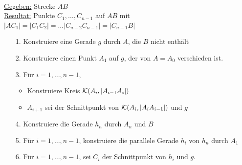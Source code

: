 \begin{konst}  
\phantom{Pups}\hspace*{1cm}\phantom{Pups}\\
\underline{Gegeben:} Strecke $AB$\\ 
\underline{Resultat:} Punkte $C_1, \ldots , C_{n-1}$ auf $AB$ mit
$|AC_1|=|C_1C_2|=\ldots |C_{n-2}C_{n-1}|=|C_{n-1}B|$ 
\begin{enumerate}
\item[1.] Konstruiere eine Gerade $g$ durch $A$, die $B$ nicht enthält 
\item[2.] Konstruiere einen Punkt $A_1$ auf $g$, der von $A=A_0$
  verschieden ist.
\item[3.] Für $i=1,\ldots ,{n-1}$,
\begin{itemize}
\item Konstruiere  Kreis ${\mathcal K}(A_i,|A_{i-1}A_i|)$
\item $A_{i+1}$ sei der Schnittpunkt von ${\mathcal K}(A_i,|A_{i}A_{i-1}|)$ und $g$
\end{itemize}
\item[4.] Konstruiere die Gerade $h_n$ durch $A_n$ und $B$
\item[5.]  Für $i=1,\ldots ,{n-1}$, konstruiere die parallele Gerade
  $h_i$ von $h_n$ durch $A_1$
\item[6.] Für $i=1,\ldots ,{n-1}$, sei $C_i$ der Schnittpunkt von
  $h_i$ und $g$.
\end{enumerate}
\end{konst}



